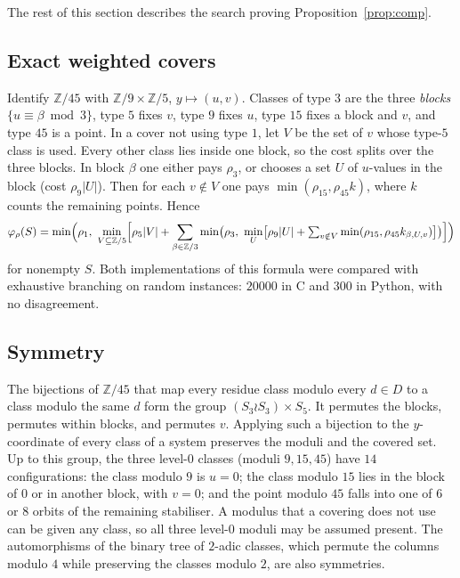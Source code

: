 \documentclass[11pt]{amsart}
\theoremstyle{definition}
\theoremstyle{remark}
\newcommand{\Z}{\mathbb Z}
\begin{document}
The rest of this section describes the search proving Proposition~\ref{prop:comp}.

\subsection*{Exact weighted covers} Identify $\Z/45$ with $\Z/9\times\Z/5$, $y\mapsto(u,v)$. Classes of type $3$ are the three \emph{blocks} $\{u\equiv\beta\bmod 3\}$, type $5$ fixes $v$, type $9$ fixes $u$, type $15$ fixes a block and $v$, and type $45$ is a point. In a cover not using type $1$, let $V$ be the set of $v$ whose type-$5$ class is used. Every other class lies inside one block, so the cost splits over the three blocks. In block $\beta$ one either pays $\rho_3$, or chooses a set $U$ of $u$-values in the block (cost $\rho_9|U|$). Then for each $v\notin V$ one pays $\min(\rho_{15},\rho_{45}k)$, where $k$ counts the remaining points. Hence
\[ \varphi_\rho(S)=\min\Bigl(\rho_1,\ \min_{V\subseteq\Z/5}\Bigl[\rho_5|V|+\sum_{\beta\in\Z/3}\min\bigl(\rho_3,\ \min_{U}\bigl[\rho_9|U|+\textstyle\sum_{v\notin V}\min(\rho_{15},\rho_{45}k_{\beta,U,v})\bigr]\bigr)\Bigr]\Bigr) \]
for nonempty $S$. Both implementations of this formula were compared with exhaustive branching on random instances: $20000$ in C and $300$ in Python, with no disagreement.

\subsection*{Symmetry} The bijections of $\Z/45$ that map every residue class modulo every $d\in D$ to a class modulo the same $d$ form the group $(S_3\wr S_3)\times S_5$. It permutes the blocks, permutes within blocks, and permutes $v$. Applying such a bijection to the $y$-coordinate of every class of a system preserves the moduli and the covered set. Up to this group, the three level-$0$ classes (moduli $9,15,45$) have $14$ configurations: the class modulo $9$ is $u=0$; the class modulo $15$ lies in the block of $0$ or in another block, with $v=0$; and the point modulo $45$ falls into one of $6$ or $8$ orbits of the remaining stabiliser. A modulus that a covering does not use can be given any class, so all three level-$0$ moduli may be assumed present. The automorphisms of the binary tree of $2$-adic classes, which permute the columns modulo $4$ while preserving the classes modulo $2$, are also symmetries.
\end{document}
